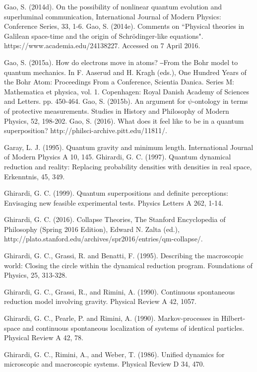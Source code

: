 \begin{thebibliography}{}
\bibitem{} Gao, S. (2014d). On the possibility of nonlinear quantum evolution and superluminal communication, International Journal of Modern Physics: Conference Series, 33, 1-6.
\bibitem{} Gao, S. (2014e). Comments on ``Physical theories in Galilean space-time and the origin of Schrödinger-like equations". https://www.academia.edu/24138227. Accessed on 7 April 2016.

\bibitem{} Gao, S. (2015a). How do electrons move in atoms? ‒From the Bohr model to quantum mechanics. In F. Aaserud and H. Kragh (eds.), One Hundred Years of the Bohr Atom: Proceedings From a Conference, Scientia Danica. Series M: Mathematica et physica, vol. 1. Copenhagen: Royal Danish Academy of Sciences and Letters. pp. 450-464.
\bibitem{} Gao, S. (2015b). An argument for $\psi$-ontology in terms of protective measurements. Studies in History and Philosophy of Modern Physics, 52, 198-202.
\bibitem{} Gao, S. (2016). What does it feel like to be in a quantum superposition? http://philsci-archive.pitt.edu/11811/.

\bibitem{} Garay, L. J.  (1995). Quantum gravity and minimum length. International Journal of Modern Physics A 10, 145.
\bibitem{}  Ghirardi, G. C. (1997). Quantum dynamical reduction and reality: Replacing probability densities with densities in real space, Erkenntnis, 45, 349. 

\bibitem{}  Ghirardi, G. C. (1999). Quantum superpositions and definite perceptions: Envisaging new feasible
experimental tests. Physics Letters A 262, 1-14.

\bibitem{} Ghirardi, G. C. (2016). Collapse Theories, The Stanford Encyclopedia of Philosophy (Spring 2016 Edition), Edward N. Zalta (ed.), http://plato.stanford.edu/archives/spr2016/entries/qm-collapse/.

\bibitem{} Ghirardi, G. C., Grassi, R. and Benatti, F. (1995). Describing the macroscopic world: Closing the circle within the dynamical reduction program. Foundations of Physics, 25, 313-328.

\bibitem{} Ghirardi, G. C., Grassi, R., and Rimini, A. (1990). Continuous spontaneous reduction model involving gravity. Physical Review A 42, 1057.

\bibitem{} Ghirardi, G. C., Pearle, P. and Rimini, A. (1990). Markov-processes in Hilbert-space and continuous spontaneous localization of systems of identical particles. Physical Review A 42, 78.

\bibitem{} Ghirardi, G. C., Rimini, A., and Weber, T. (1986). Unified dynamics for microscopic and macroscopic systems. Physical Review D 34, 470.


\end{thebibliography}
